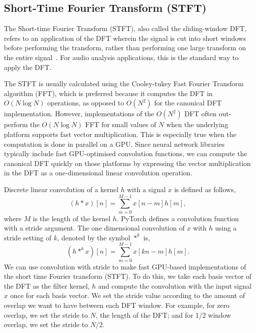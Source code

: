 \documentclass{ieeeaccess}
\begin{document}
\subsection{Short-Time Fourier Transform (STFT)} \label{subsec:STFT}
The Short-time Fourier Transform (STFT), also called the sliding-window DFT, refers to an application of the DFT wherein the signal is cut into short windows before performing the transform, rather than performing one large transform on the entire signal~\cite{Nawab:1987:SFT:42739.42745}. For audio analysis applications, this is the standard way to apply the DFT.


The STFT is usually calculated using the Cooley-tukey Fast Fourier Transform algorithm (FFT), which is preferred because it computes the DFT in $O(N \log N)$ operations, as opposed to $O(N^2)$ for the canonical DFT implementation. However, implementations of the $O(N^2)$ DFT often out-perform the $O(N \log N)$ FFT for small values of $N$ when the underlying platform supports fast vector multiplication. This is especially true when the computation is done in parallel on a GPU. Since neural network libraries typically include fast GPU-optimised convolution functions, we can compute the canonical DFT quickly on those platforms by expressing the vector multiplication in the DFT as a one-dimensional linear convolution operation. 

Discrete linear convolution of a kernel $h$ with a signal $x$ is defined as follows,
\begin{equation}
    (h * x)[n] = \sum^{M-1}_{m=0}x[n-m]h[m],\label{convolutionDefinition}
\end{equation}
where $M$ is the length of the kernel $h$. PyTorch defines a convolution function with a stride argument. The one dimensional convolution of $x$ with $h$ using a stride setting of $k$, denoted by the symbol $*^k$ is,
\begin{equation}
    (h *^k x)[n] = \sum^{M-1}_{m=0}x[k n-m]h[m].\label{convolutionWithStride}
\end{equation}
We can use convolution with stride to make fast GPU-based implementations of the short time Fourier transform (STFT). To do this, we take each basis vector of the DFT as the filter kernel, $h$ and compute the convolution with the input signal $x$ once for each basis vector. We set the stride value according to the amount of overlap we want to have between each DFT window. For example, for zero overlap, we set the stride to $N$, the length of the DFT; and for 1/2 window overlap, we set the stride to $N/2$.
\end{document}
